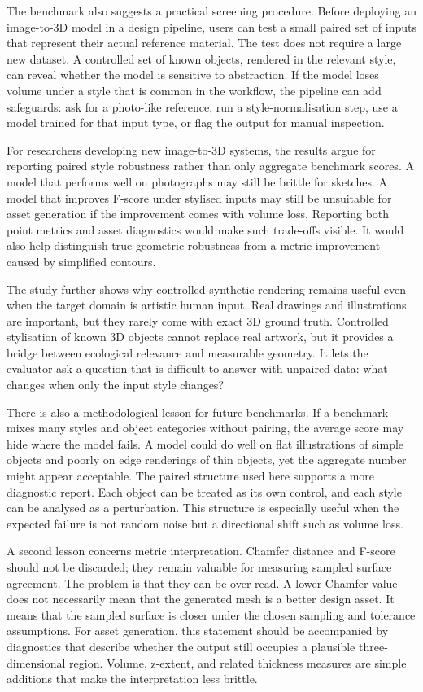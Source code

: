 \documentclass[12pt,a4paper]{article}
\begin{document}
The benchmark also suggests a practical screening procedure. Before deploying an image-to-3D model in a design pipeline, users can test a small paired set of inputs that represent their actual reference material. The test does not require a large new dataset. A controlled set of known objects, rendered in the relevant style, can reveal whether the model is sensitive to abstraction. If the model loses volume under a style that is common in the workflow, the pipeline can add safeguards: ask for a photo-like reference, run a style-normalisation step, use a model trained for that input type, or flag the output for manual inspection.

For researchers developing new image-to-3D systems, the results argue for reporting paired style robustness rather than only aggregate benchmark scores. A model that performs well on photographs may still be brittle for sketches. A model that improves F-score under stylised inputs may still be unsuitable for asset generation if the improvement comes with volume loss. Reporting both point metrics and asset diagnostics would make such trade-offs visible. It would also help distinguish true geometric robustness from a metric improvement caused by simplified contours.

The study further shows why controlled synthetic rendering remains useful even when the target domain is artistic human input. Real drawings and illustrations are important, but they rarely come with exact 3D ground truth. Controlled stylisation of known 3D objects cannot replace real artwork, but it provides a bridge between ecological relevance and measurable geometry. It lets the evaluator ask a question that is difficult to answer with unpaired data: what changes when only the input style changes?

There is also a methodological lesson for future benchmarks. If a benchmark mixes many styles and object categories without pairing, the average score may hide where the model fails. A model could do well on flat illustrations of simple objects and poorly on edge renderings of thin objects, yet the aggregate number might appear acceptable. The paired structure used here supports a more diagnostic report. Each object can be treated as its own control, and each style can be analysed as a perturbation. This structure is especially useful when the expected failure is not random noise but a directional shift such as volume loss.

A second lesson concerns metric interpretation. Chamfer distance and F-score should not be discarded; they remain valuable for measuring sampled surface agreement. The problem is that they can be over-read. A lower Chamfer value does not necessarily mean that the generated mesh is a better design asset. It means that the sampled surface is closer under the chosen sampling and tolerance assumptions. For asset generation, this statement should be accompanied by diagnostics that describe whether the output still occupies a plausible three-dimensional region. Volume, z-extent, and related thickness measures are simple additions that make the interpretation less brittle.
\end{document}
